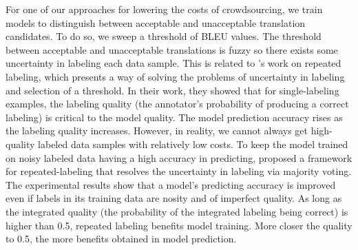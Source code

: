 \documentclass[11pt]{article}
\begin{document}
For one of our approaches for lowering the costs of crowdsourcing,  we train models to distinguish between acceptable and unacceptable translation candidates.  To do so,
we sweep a threshold of BLEU values. The threshold between acceptable and unacceptable translations is fuzzy so there exists some uncertainty in labeling each data sample.  This is related to \cite{sheng2008get}'s work on repeated labeling, which presents a way of solving the problems of   uncertainty in labeling and selection of a threshold. In their work, they showed that for single-labeling examples, the labeling quality (the annotator's probability of producing a correct labeling) is critical to the model quality. The model prediction accuracy rises as the labeling quality increases. However, in reality, we cannot always get high-quality labeled data samples with relatively low costs. To keep the model trained on noisy labeled data having a high accuracy in predicting,  proposed a framework for repeated-labeling that resolves the uncertainty in labeling via majority voting.  
The experimental results show that a model's predicting accuracy is improved even if labels in its training data are nosity and of imperfect quality.  As long as the integrated quality (the probability of the integrated labeling being correct) is higher than 0.5, repeated labeling benefits model training. More closer the quality to 0.5, the more benefits obtained in model prediction.


\end{document}
